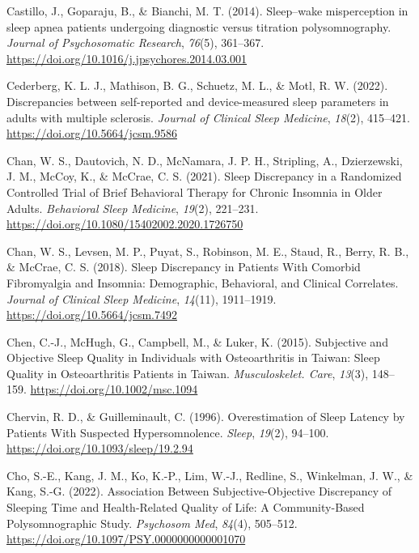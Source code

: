 \documentclass[
]{article}
\newlength{\cslhangindent}
\newenvironment{CSLReferences}[2] %
 {\begin{list}{}{%
  \setlength{\itemindent}{0pt}
  \setlength{\leftmargin}{0pt}
  \setlength{\parsep}{0pt}
  \ifodd #1
   \setlength{\leftmargin}{\cslhangindent}
   \setlength{\itemindent}{-1\cslhangindent}
  \fi
  \setlength{\itemsep}{#2\baselineskip}}}
 {\end{list}}
\begin{document}
\begin{CSLReferences}{1}{0}
Castillo, J., Goparaju, B., \& Bianchi, M. T. (2014). Sleep--wake misperception in sleep apnea patients undergoing diagnostic versus titration polysomnography. \emph{Journal of Psychosomatic Research}, \emph{76}(5), 361--367. \url{https://doi.org/10.1016/j.jpsychores.2014.03.001}

Cederberg, K. L. J., Mathison, B. G., Schuetz, M. L., \& Motl, R. W. (2022). Discrepancies between self-reported and device-measured sleep parameters in adults with multiple sclerosis. \emph{Journal of Clinical Sleep Medicine}, \emph{18}(2), 415--421. \url{https://doi.org/10.5664/jcsm.9586}

Chan, W. S., Dautovich, N. D., McNamara, J. P. H., Stripling, A., Dzierzewski, J. M., McCoy, K., \& McCrae, C. S. (2021). Sleep {Discrepancy} in a {Randomized} {Controlled} {Trial} of {Brief} {Behavioral} {Therapy} for {Chronic} {Insomnia} in {Older} {Adults}. \emph{Behavioral Sleep Medicine}, \emph{19}(2), 221--231. \url{https://doi.org/10.1080/15402002.2020.1726750}

Chan, W. S., Levsen, M. P., Puyat, S., Robinson, M. E., Staud, R., Berry, R. B., \& McCrae, C. S. (2018). Sleep {Discrepancy} in {Patients} {With} {Comorbid} {Fibromyalgia} and {Insomnia}: {Demographic}, {Behavioral}, and {Clinical} {Correlates}. \emph{Journal of Clinical Sleep Medicine}, \emph{14}(11), 1911--1919. \url{https://doi.org/10.5664/jcsm.7492}

Chen, C.-J., McHugh, G., Campbell, M., \& Luker, K. (2015). Subjective and {Objective} {Sleep} {Quality} in {Individuals} with {Osteoarthritis} in {Taiwan}: {Sleep} {Quality} in {Osteoarthritis} {Patients} in {Taiwan}. \emph{Musculoskelet. Care}, \emph{13}(3), 148--159. \url{https://doi.org/10.1002/msc.1094}

Chervin, R. D., \& Guilleminault, C. (1996). Overestimation of {Sleep} {Latency} by {Patients} {With} {Suspected} {Hypersomnolence}. \emph{Sleep}, \emph{19}(2), 94--100. \url{https://doi.org/10.1093/sleep/19.2.94}

Cho, S.-E., Kang, J. M., Ko, K.-P., Lim, W.-J., Redline, S., Winkelman, J. W., \& Kang, S.-G. (2022). Association {Between} {Subjective}-{Objective} {Discrepancy} of {Sleeping} {Time} and {Health}-{Related} {Quality} of {Life}: {A} {Community}-{Based} {Polysomnographic} {Study}. \emph{Psychosom Med}, \emph{84}(4), 505--512. \url{https://doi.org/10.1097/PSY.0000000000001070}


\end{CSLReferences}
\end{document}
